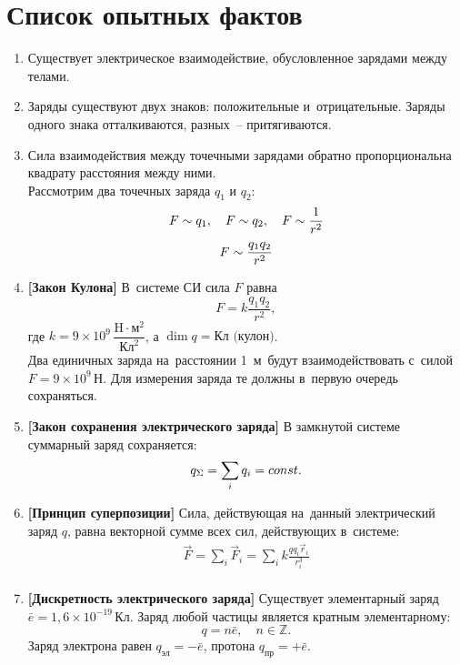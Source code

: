 \section{Список опытных фактов}

\begin{enumerate}
	\item Существует электрическое взаимодействие, обусловленное зарядами между телами.
	\item Заряды существуют двух знаков: положительные и~отрицательные. Заряды одного знака отталкиваются, разных~-- притягиваются.
	\item Сила взаимодействия между точечными зарядами обратно пропорциональна квадрату расстояния между ними. \\
			Рассмотрим два точечных заряда $q_1$ и $q_2$:
				$$F \sim q_1, \quad F \sim q_2, \quad F \sim \frac{1}{r^2}$$
				$$F \sim \frac{q_1q_2}{r^2}$$
	\item \textbf{[Закон Кулона]} В~системе СИ сила $F$ равна
				$$F=k\frac{q_1q_2}{r^2},$$
			где $k=9 \times 10^9 \,\dfrac{\text{H}\cdot \text{м}^2}{\text{Кл}^2}$, а $\dim{q}=\text{Кл (кулон)}$. \\
			Два единичных заряда на~расстоянии 1~м~будут взаимодействовать с~силой $F=9\times 10^9 \, \text{Н}$. Для измерения заряда те должны в~первую очередь сохраняться.
	\item \textbf{[Закон сохранения электрического заряда]} В замкнутой системе суммарный заряд сохраняется:
				$$q_{\Sigma}=\sum_i q_i=const.$$
	\item \textbf{[Принцип суперпозиции]} Сила, действующая на~данный электрический заряд $q$, равна векторной сумме всех сил, действующих в~системе:
			\begin{eqnarray*}\label{1}
				\vec{F} = \sum_i \vec{F}_i = \sum_i k\frac{qq_i\vec{r}_i}{r_i^3} \\
			\end{eqnarray*} 
	\item \textbf{[Дискретность электрического заряда]} Существует элементарный заряд $\bar{e}=1,6 \times 10^{-19} \, \text{Кл}$. Заряд любой частицы является кратным элементарному:
				$$q=n\bar{e}, \quad n \in \mathbb{Z}.$$
				Заряд электрона равен $q_{\text{эл}}=-\bar{e}$, протона $q_{\text{пр}}=+\bar{e}$.

\end{enumerate}